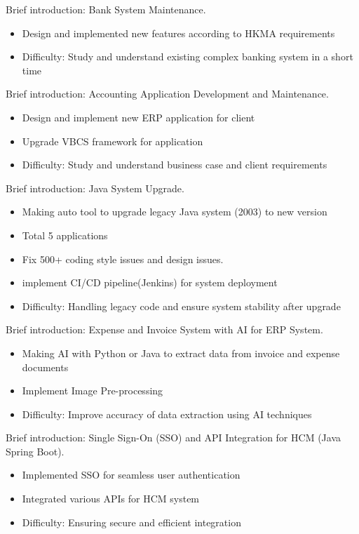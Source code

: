 \documentclass{resume}
\begin{document}
Brief introduction: Bank System Maintenance.
\begin{itemize}
  \item Design and implemented new features according to HKMA requirements
  \item Difficulty: Study and understand existing complex banking system in a short time
\end{itemize}
Brief introduction: Accounting Application Development and Maintenance.
\begin{itemize}
  \item Design and implement new ERP application for client
  \item Upgrade VBCS framework for application
  \item Difficulty: Study and understand business case and client requirements
\end{itemize}
Brief introduction: Java System Upgrade.
\begin{itemize}
  \item Making auto tool to upgrade legacy Java system (2003) to new version
  \item Total 5 applications
  \item Fix 500+ coding style issues and design issues.
  \item implement CI/CD pipeline(Jenkins) for system deployment
  \item Difficulty: Handling legacy code and ensure system stability after upgrade
\end{itemize}
Brief introduction: Expense and Invoice System with AI for ERP System.
\begin{itemize}
  \item Making AI with Python or Java to extract data from invoice and expense documents
  \item Implement Image Pre-processing
  \item Difficulty: Improve accuracy of data extraction using AI techniques
\end{itemize}
Brief introduction: Single Sign-On (SSO) and API Integration for HCM (Java Spring Boot).
\begin{itemize}
  \item Implemented SSO for seamless user authentication
  \item Integrated various APIs for HCM system
  \item Difficulty: Ensuring secure and efficient integration
\end{itemize}

\end{document}
